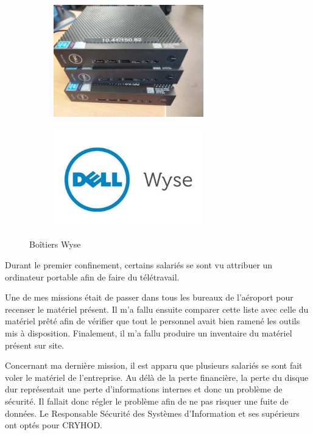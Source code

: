 \begin{figure}[hbt!]
  \begin{subfigure}{0.5\textwidth}
    \centering
    \includegraphics[width=6.5cm]{Images/wyse.jpg}  
    \label{fig:wyse}
  \end{subfigure}
  \begin{subfigure}{0.5\textwidth}
    \centering
    \includegraphics[width=6.5cm]{Images/wyse_logo.jpg}  
    \label{fig:logowyse}
  \end{subfigure}
  \caption{Boîtiers Wyse}
\end{figure}

Durant le premier confinement, certains salariés se sont vu attribuer un ordinateur portable afin de faire du télétravail.

Une de mes missions était de passer dans tous les bureaux de l’aéroport pour recenser le matériel présent. Il m'a fallu ensuite comparer cette liste avec celle du matériel prêté afin de vérifier que tout le personnel avait bien ramené les outils mis à disposition.
Finalement, il m'a fallu produire un inventaire du matériel présent sur site.\newline


Concernant ma dernière mission, il est apparu que plusieurs salariés se sont fait voler le matériel de l'entreprise. Au délà de la perte financière, la perte du disque dur représentait une perte d’informations internes et donc un problème de sécurité. Il fallait donc régler le problème afin de ne pas risquer une fuite de données. Le Responsable Sécurité des Systèmes d’Information et ses supérieurs ont optés pour CRYHOD.


